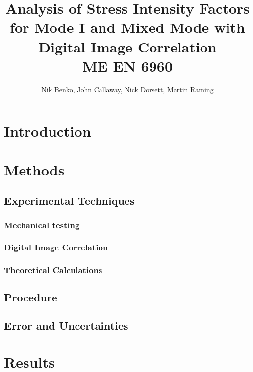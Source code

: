 \documentclass[12pt]{article}
\begin{document}
\title{ Analysis of Stress Intensity Factors for Mode I and Mixed Mode with Digital Image Correlation \\ \normalsize{ME EN 6960}}
\author{Nik Benko, John Callaway, Nick Dorsett, Martin Raming}
\maketitle

\begin{abstract}%
\end{abstract}

\section{Introduction} %

\section{Methods}

\subsection{Experimental Techniques} 
\subsubsection{Mechanical testing} %
\subsubsection{Digital Image Correlation} %
\subsubsection{Theoretical Calculations} %



\subsection{Procedure} %

\subsection{Error and Uncertainties} %

\section{Results}%
\end{document}
